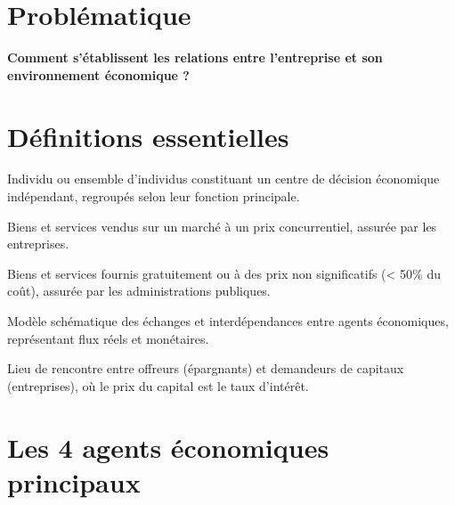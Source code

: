 \documentclass[12pt,a4paper]{article}
\begin{document}
\section*{Problématique}
\textbf{Comment s'établissent les relations entre l'entreprise et son environnement économique ?}

\section{Définitions essentielles}

\begin{tcolorbox}[title=\textbf{DÉFINITION : Agent économique}]
Individu ou ensemble d'individus constituant un centre de décision économique indépendant, regroupés selon leur fonction principale.
\end{tcolorbox}

\vspace{3mm}
\begin{tcolorbox}[title=\textbf{DÉFINITION : Production marchande}]
Biens et services vendus sur un marché à un prix concurrentiel, assurée par les entreprises.
\end{tcolorbox}

\vspace{3mm}
\begin{tcolorbox}[title=\textbf{DÉFINITION : Production non marchande}]
Biens et services fournis gratuitement ou à des prix non significatifs (< 50\% du coût), assurée par les administrations publiques.
\end{tcolorbox}

\vspace{3mm}
\begin{tcolorbox}[title=\textbf{DÉFINITION : Circuit économique}]
Modèle schématique des échanges et interdépendances entre agents économiques, représentant flux réels et monétaires.
\end{tcolorbox}

\vspace{3mm}
\begin{tcolorbox}[title=\textbf{DÉFINITION : Marché des capitaux}]
Lieu de rencontre entre offreurs (épargnants) et demandeurs de capitaux (entreprises), où le prix du capital est le taux d'intérêt.
\end{tcolorbox}

\section{Les 4 agents économiques principaux}
\end{document}

